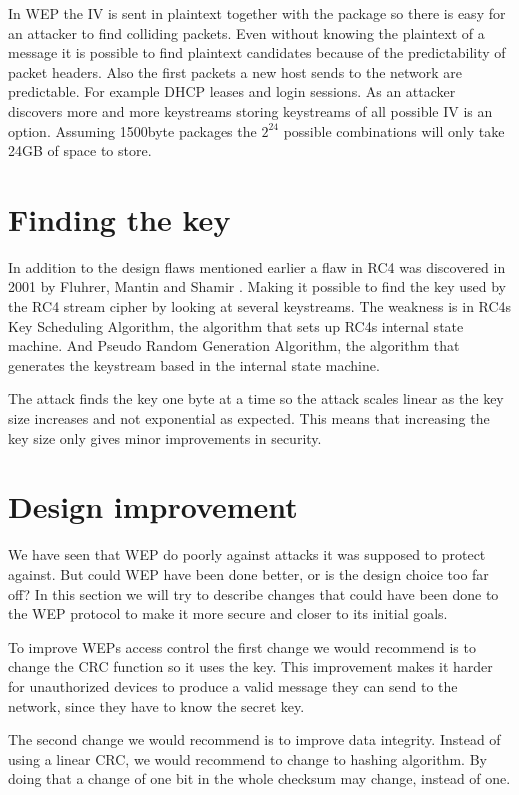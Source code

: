 \documentclass[twocolumn,11pt]{IEEEtran}
\begin{document}
In WEP the IV is sent in plaintext together with the package so there is easy for an attacker to find colliding packets. Even without knowing the plaintext of a message it is possible to find plaintext candidates because of the predictability of packet headers. Also the first packets a new host sends to the network are predictable. For example DHCP leases and login sessions. As an attacker discovers more and more keystreams storing keystreams of all possible IV is an option. Assuming 1500byte packages the $2^24$ possible combinations will only take 24GB of space to store.

\section {Finding the key}
\label{sec:find_key}
In addition to the design flaws mentioned earlier a flaw in RC4 was discovered in 2001 by Fluhrer, Mantin and Shamir \cite{Fluhrer:New}. Making it possible to find the key used by the RC4 stream cipher by looking at several keystreams. The weakness is in RC4s Key Scheduling Algorithm, the algorithm that sets up RC4s internal state machine. And Pseudo Random Generation Algorithm, the algorithm that generates the keystream based in the internal state machine. 

The attack finds the key one byte at a time so the attack scales linear as the key size increases and not exponential as expected. This means that increasing the key size only gives minor improvements in security.


\section{Design improvement}
\label{sec:improvement}

We have seen that WEP do poorly against attacks it was supposed to protect against. But could WEP have been done better, or is the design choice too far off? In this section we will try to describe changes that could have been done to the WEP protocol to make it more secure and closer to its initial goals.

To improve WEPs access control the first change we would recommend is to change the CRC function so it uses the key. This improvement makes it harder for unauthorized devices to produce a valid message they can send to the network, since they have to know the secret key. 

The second change we would recommend is to improve data integrity. Instead of using a linear CRC, we would recommend to change to hashing algorithm. By doing that a change of one bit in the whole checksum may change, instead of one. 
\end{document}
